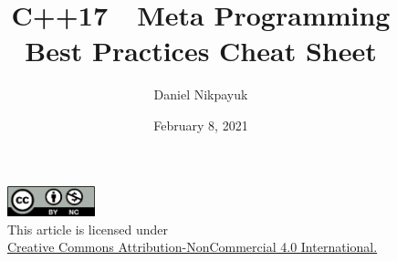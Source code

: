 \documentclass[twoside]{article}
\title{C++17\ \ Meta Programming\\Best Practices Cheat Sheet}
\author{Daniel Nikpayuk}
\date{February 8, 2021}
\begin{document}
\maketitle
\thispagestyle{empty}

\begin{figure}[h]
\centering
\includegraphics[width=1in]{cc-by-nc.png}\\[0.1in]
\tiny This article is licensed under \\
\href{http://creativecommons.org/licenses/by-nc/4.0/}
{Creative Commons Attribution-NonCommercial 4.0 International.}\\[0.3in]
\end{figure}
\end{document}
